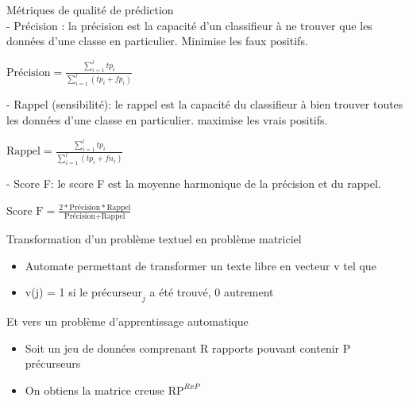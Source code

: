 \begin{frame}	
	
	Métriques de qualité de prédiction\\
	- Précision : la précision est la capacité d'un classifieur à ne trouver que les données d'une classe en particulier. Minimise les faux positifs.	\begin{center}
		$\textrm{Précision} = \frac{\sum_{i=1}^{l} tp_i}{\sum_{i=1}^{l} (tp_i + fp_i)}$
	\end{center}
	
	- Rappel (sensibilité): le rappel est la capacité du classifieur à bien trouver toutes les données d'une classe en particulier. maximise les vrais positifs.
		\begin{center}
		$\textrm{Rappel} = \frac{\sum_{i=1}^{l} tp_i}{\sum_{i=1}^{l} (tp_i + fn_i)}$
	\end{center}
	
	- Score F: le score F est la moyenne harmonique de la précision et du rappel. 
	\begin{center}
		$\textrm{Score F} = \frac{2 * \textrm{Précision} * \textrm{Rappel}}{\textrm{Précision} + \textrm{Rappel}}$ 
	\end{center}
	
\end{frame}

\begin{frame}	
	Transformation d'un problème textuel en problème matriciel
	\begin{itemize}
		\item Automate permettant de transformer un texte libre en vecteur v tel que
		\item v(j) = 1 si le $\textrm{précurseur}_j$ a été trouvé, 0 autrement 
	\end{itemize}
	
	Et vers un problème d'apprentissage automatique
	\begin{itemize}
		\item Soit un jeu de données comprenant R rapports pouvant contenir P précurseurs
		\item On obtiens la matrice creuse $\textrm{RP}^{RxP}$
	\end{itemize}
\end{frame}




